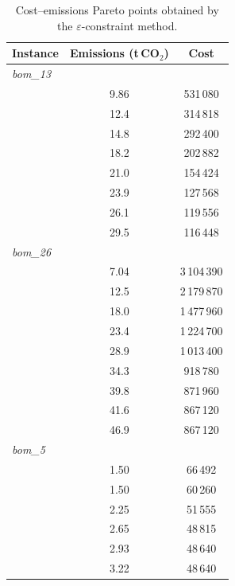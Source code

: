 \begin{table}[!htbp]\centering\small
\caption{Cost--emissions Pareto points obtained by the $\varepsilon$-constraint method.}\label{tab:paretoemis}
\begin{tabular}{lcc}
\toprule
Instance & Emissions (t\,CO$_2$) & Cost\\
\midrule
\multicolumn{3}{l}{\textit{bom\_13}} \\
 & 9.86 & 531\,080 \\
 & 12.4 & 314\,818 \\
 & 14.8 & 292\,400 \\
 & 18.2 & 202\,882 \\
 & 21.0 & 154\,424 \\
 & 23.9 & 127\,568 \\
 & 26.1 & 119\,556 \\
 & 29.5 & 116\,448 \\
\midrule
\multicolumn{3}{l}{\textit{bom\_26}} \\
 & 7.04 & 3\,104\,390 \\
 & 12.5 & 2\,179\,870 \\
 & 18.0 & 1\,477\,960 \\
 & 23.4 & 1\,224\,700 \\
 & 28.9 & 1\,013\,400 \\
 & 34.3 & 918\,780 \\
 & 39.8 & 871\,960 \\
 & 41.6 & 867\,120 \\
 & 46.9 & 867\,120 \\
\midrule
\multicolumn{3}{l}{\textit{bom\_5}} \\
 & 1.50 & 66\,492 \\
 & 1.50 & 60\,260 \\
 & 2.25 & 51\,555 \\
 & 2.65 & 48\,815 \\
 & 2.93 & 48\,640 \\
 & 3.22 & 48\,640 \\
\bottomrule
\end{tabular}
\end{table}

